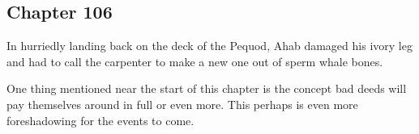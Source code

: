 \subsection{Chapter 106}

In hurriedly landing back on the deck of the Pequod, Ahab damaged his ivory
leg and had to call the carpenter to make a new one out of sperm whale bones.

One thing mentioned near the start of this chapter is the concept bad deeds
will pay themselves around in full or even more. This perhaps is even more
foreshadowing for the events to come.
